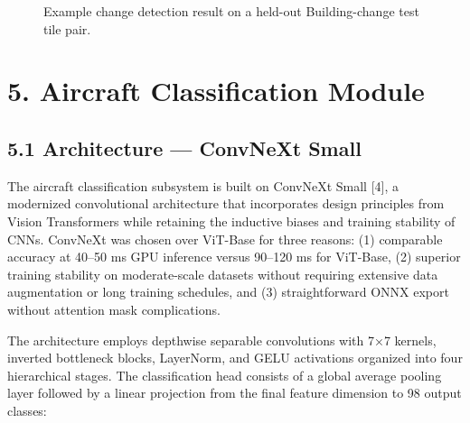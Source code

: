 \documentclass[11pt,a4paper]{article}
\begin{document}
\begin{figure}[htbp]
\centering
{}
\caption{Example change detection result on a held-out Building-change test tile pair.}
\label{fig:change-example}
\end{figure}

\hypertarget{aircraft-classification-module}{%
\section{5. Aircraft Classification Module}\label{aircraft-classification-module}}

\hypertarget{architecture-convnext-small}{%
\subsection{5.1 Architecture --- ConvNeXt Small}\label{architecture-convnext-small}}

The aircraft classification subsystem is built on ConvNeXt Small [4], a modernized convolutional architecture that incorporates design principles from Vision Transformers while retaining the inductive biases and training stability of CNNs. ConvNeXt was chosen over ViT-Base for three reasons: (1) comparable accuracy at 40--50 ms GPU inference versus 90--120 ms for ViT-Base, (2) superior training stability on moderate-scale datasets without requiring extensive data augmentation or long training schedules, and (3) straightforward ONNX export without attention mask complications.

The architecture employs depthwise separable convolutions with 7×7 kernels, inverted bottleneck blocks, LayerNorm, and GELU activations organized into four hierarchical stages. The classification head consists of a global average pooling layer followed by a linear projection from the final feature dimension to 98 output classes:
\end{document}
